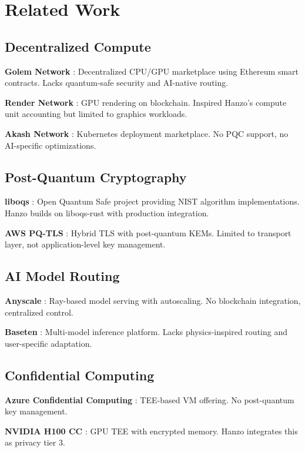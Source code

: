 \section{Related Work}


\subsection{Decentralized Compute}

\textbf{Golem Network} \cite{golem}: Decentralized CPU/GPU marketplace using Ethereum smart contracts. Lacks quantum-safe security and AI-native routing.

\textbf{Render Network} \cite{render}: GPU rendering on blockchain. Inspired Hanzo's compute unit accounting but limited to graphics workloads.

\textbf{Akash Network} \cite{akash}: Kubernetes deployment marketplace. No PQC support, no AI-specific optimizations.

\subsection{Post-Quantum Cryptography}

\textbf{liboqs} \cite{liboqs}: Open Quantum Safe project providing NIST algorithm implementations. Hanzo builds on liboqs-rust with production integration.

\textbf{AWS PQ-TLS} \cite{awspqtls}: Hybrid TLS with post-quantum KEMs. Limited to transport layer, not application-level key management.

\subsection{AI Model Routing}

\textbf{Anyscale} \cite{anyscale}: Ray-based model serving with autoscaling. No blockchain integration, centralized control.

\textbf{Baseten} \cite{baseten}: Multi-model inference platform. Lacks physics-inspired routing and user-specific adaptation.

\subsection{Confidential Computing}

\textbf{Azure Confidential Computing} \cite{azurecc}: TEE-based VM offering. No post-quantum key management.

\textbf{NVIDIA H100 CC} \cite{h100cc}: GPU TEE with encrypted memory. Hanzo integrates this as privacy tier 3.

